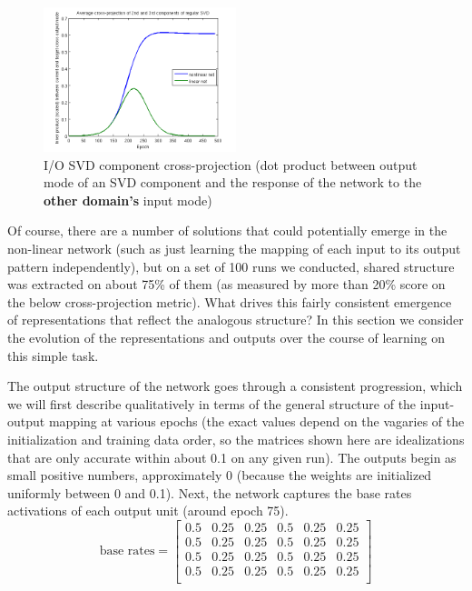 \documentclass[10pt,letterpaper]{article}
\begin{document}
\begin{figure}
\includegraphics[width=0.5\textwidth]{figures/SVD_cross_projection_learning.png}
\caption{I/O SVD component cross-projection (dot product between output mode of an SVD component and the response of the network to the \textbf{other domain's} input mode)}
\label{SVD_cross_projection_learning}
\end{figure}
Of course, there are a number of solutions that could potentially emerge in the non-linear network (such as just learning the mapping of each input to its output pattern independently), but on a set of 100 runs we conducted, shared structure was extracted on about 75\% of them (as measured by more than 20\% score on the below cross-projection metric). What drives this fairly consistent emergence of representations that reflect the analogous structure? In this section we consider the evolution of the representations and outputs over the course of learning on this simple task. \par 
The output structure of the network goes through a consistent progression, which we will first describe qualitatively in terms of the general structure of the input-output mapping at various epochs (the exact values depend on the vagaries of the initialization and training data order, so the matrices shown here are idealizations that are only accurate within about 0.1 on any given run). The outputs begin as small positive numbers, approximately 0 (because the weights are initialized uniformly between 0 and 0.1). Next, the network captures the base rates activations of each output unit (around epoch 75).
\[ 
\text{base rates} = \left[ \begin{matrix} 
0.5 & 0.25 & 0.25 & 0.5 & 0.25 & 0.25 \\
0.5 & 0.25 & 0.25 & 0.5 & 0.25 & 0.25 \\
 0.5 & 0.25 & 0.25 & 0.5 & 0.25 & 0.25\\
 0.5 & 0.25 & 0.25 & 0.5 & 0.25 & 0.25\\
\end{matrix}  \right] 
\] 
\end{document}
